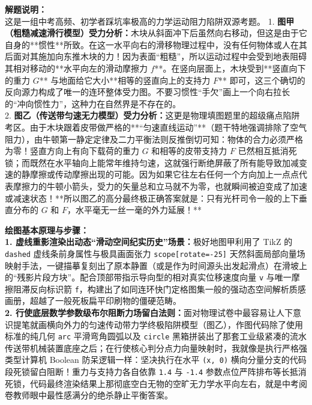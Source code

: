 {\small\color{gray}
\textbf{解题说明：}\\
这是一组中考高频、初学者踩坑率极高的力学运动阻力陷阱双源考题。
1. \textbf{图甲（粗糙减速滑行模型）受力分析：}木块从斜面冲下后虽然向右移动，但这是由于它自身的**惯性**所致。在这一水平向右的滑移物理过程中，没有任何物体或人在其后面对其施加向东推木块的力！因为表面“粗糙”，所以运动过程中会受到地表阻碍其相对移动的**水平向左的滑动摩擦力 $f$**。在竖向层面上，木块受到**竖直向下的重力 $G$** 与地面给它大小**相等的竖直向上的支持力 $F$** 即可，这三个确切的反向源力构成了唯一的连环整体受力图。不要习惯性“手欠”画上一个向右拉长的“冲向惯性力”，这种力在自然界是不存在的。\\
2. \textbf{图乙（传送带匀速无力模型）受力分析：}这更是物理填图题里的超级痛点陷阱考区。由于木块跟着皮带做严格的**“匀速直线运动”**（题干特地强调排除了空气阻力），由牛顿第一静定定律及二力平衡法则反推倒切可知：物体的合力必须严格为零！竖直方向上有向下载荷的重力 $G$ 和相等的皮带支持力 $F$ 已然相互抵消死锁；而既然在水平轴向上能常年维持匀速，这就强行断绝屏蔽了所有能导致加减变速的静摩擦或传动摩擦出现的可能。因为如果它往左右任何一个方向加上一点点代表摩擦力的牛顿小箭头，受力的矢量总和立马就不为零，也就瞬间被迫变成了加速或减速状态！**所以图乙的高分最终极正确答案就是：只有光杆司令一般的上下垂直分布的 $G$ 和 $F$，水平毫无一丝一毫的外力延展！**
}

\vspace{0.6cm}

{\small\color{blue!70!black}
\textbf{绘图基本原理与步骤：}\\
\textbf{1. 虚线重影渲染出动态“滑动空间纪实历史”场景：}极好地图甲利用了 TikZ 的 \texttt{dashed} 虚线条前身属性与极具画面张力 \texttt{scope[rotate=-25]} 天然斜面局部向量场映射手法，一键描摹复刻出了原本静置（或是作为时间源头出发起滑点）在滑坡上的“残影片段方块”。配合顶部带指示导向型的相对真实位移速度向量 \texttt{v} 与唯一摩擦阻滞反向标识箭 \texttt{f}，构建出了如同连环快门定格图集一般的强动态空间解析质感画册，超越了一般死板扁平印刷物的僵硬范畴。\\
\textbf{2. 行使底层数学参数级布尔阻断力场留白法则：}面对物理试卷中最容易让人下意识提笔就画横向外力的匀速传动带力学终极陷阱模型（图乙），作图代码除了使用标准的纯几何 \texttt{arc} 平滑弯角圆弧以及 \texttt{circle} 黑箱拼装出了那套工业级紧凑的流水传送带机械装置底座之后；在行使核心判分点力向量映射时，我就像是执行严格强类型计算机 Boolean 防呆逻辑一样：坚决执行在水平 \texttt{(x, 0)} 横向分量分支的代码段死锁留白阻断！重力与支持力各自依靠 \texttt{1.4} 与 \texttt{-1.4} 参数点位严阵排布等长抵消死锁，代码最终渲染结果上那彻底空白无物的空旷无力学水平向左右，就是中考阅卷教师眼中最性感满分的绝杀静止平衡答案。
}

